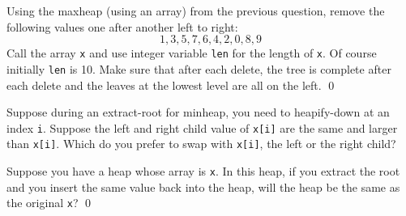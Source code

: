 \begin{ex}
  Using the maxheap (using an array) from the previous question,
  remove the following values one after another left to right:
  \[
    1, 3, 5, 7, 6, 4, 2, 0, 8, 9
  \]
  Call the array \texttt{x} and use integer variable \texttt{len}
  for the length of \texttt{x}.
  Of course initially \texttt{len} is 10.
  Make sure that after each delete, the tree is complete after each delete and 
  the leaves
  at the lowest level are all on the left.
  \qed
\end{ex}

\begin{ex}
  Suppose during an extract-root for minheap,
  you need to heapify-down at an index \verb!i!.
  Suppose the left and right child value of \verb!x[i]! are the same and
  larger than \verb!x[i]!.
  Which do you prefer to swap with \verb!x[i]!, the left or the right
  child?
\end{ex}
%

\begin{ex}
  Suppose you have a heap whose array is \verb!x!.
  In this heap, if you extract the root and you insert the same value back
  into the heap, will the heap be the same as the original \verb!x!?
  \qed
\end{ex}
%
%
%
